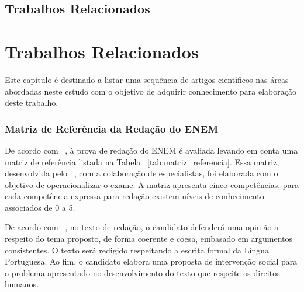 \section{Trabalhos Relacionados}
\chapter{Trabalhos Relacionados}\label{trab_rela}

Este capítulo é destinado a listar uma sequência de artigos científicos nas áreas abordadas neste estudo com o objetivo de adquirir conhecimento para elaboração deste trabalho.

\subsection{Matriz de Referência da Redação do ENEM}

De acordo com ~\cite{silvio_taynan:2017}, à prova de redação do ENEM é avaliada levando em conta uma matriz de referência listada na Tabela ~\ref{tab:matriz_referencia}. Essa matriz, desenvolvida pelo ~\cite{edital_enem:2016}, com a colaboração de especialistas, foi elaborada com o objetivo de operacionalizar o exame. A matriz apresenta cinco competências, para cada competência expressa para redação existem níveis de conhecimento associados de 0 a 5.

De acordo com ~\cite{braga:2015}, no texto de redação, o candidato defenderá uma opinião a respeito do tema proposto, de forma coerente e coesa, embasado em argumentos consistentes. O texto será redigido respeitando a escrita formal da Língua Portuguesa. Ao fim, o candidato elabora uma proposta de intervenção social para o problema apresentado no desenvolvimento do texto que respeite os direitos humanos.

